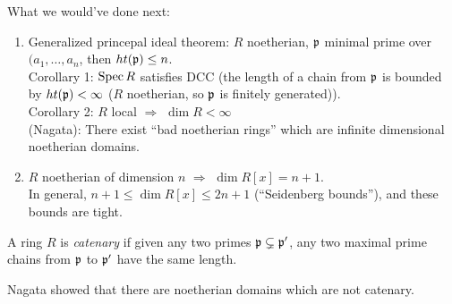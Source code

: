  \setcounter{lecture}{42}

 What we would've done next:
 \begin{enumerate}
   \item Generalized princepal ideal theorem: $R$ noetherian, $\mathfrak{p}$ minimal prime over
   $(a_1,\dots, a_n$, then $ht(\mathfrak{p})\le n$.\\
   Corollary 1: $\operatorname{Spec} R$ satisfies DCC (the length of a chain from $\mathfrak{p}$ is bounded by
   $ht(\mathfrak{p})< \infty$ ($R$ noetherian, so $\mathfrak{p}$ is finitely generated)).\\
   Corollary 2: $R$ local $\Rightarrow$ $\dim R< \infty$\\
   (Nagata): There exist ``bad noetherian rings'' which are infinite dimensional noetherian
   domains.

   \item $R$ noetherian of dimension $n$ $\Longrightarrow$ $\dim R[x] = n+1$.\\
   In general, $n+1\le \dim R[x] \le 2n+1$ (``Seidenberg bounds''), and these bounds are
   tight.
 \end{enumerate}

 \begin{definition}
   A ring $R$ is \emph{catenary} if given any two primes $\mathfrak{p}\subsetneq \mathfrak{p}'$, any two
   maximal prime chains from $\mathfrak{p}$ to $\mathfrak{p}'$ have the same length.
 \end{definition}
 Nagata showed that there are noetherian domains which are not catenary.

